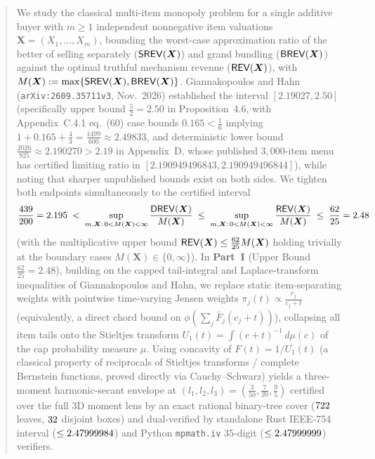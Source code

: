 \begin{abstract}
We study the classical multi-item monopoly problem for a single additive buyer with $m \ge 1$ independent nonnegative item valuations $\bm{X} = (X_1,\dots,X_m)$, bounding the worst-case approximation ratio of the better of selling separately ($\SREV(\bm{X})$) and grand bundling ($\BREV(\bm{X})$) against the optimal truthful mechanism revenue ($\REV(\bm{X})$), with $M(\bm{X}) := \max\{\SREV(\bm{X}), \BREV(\bm{X})\}$. Giannakopoulos and Hahn (\texttt{arXiv:2609.35711v3}, Nov.\ 2026) established the interval $[2.19027, 2.50]$ (specifically upper bound $\frac{5}{2} = 2.50$ in Proposition~4.6, with Appendix~C.4.1 eq.~(60) case bounds $0.165 < \frac{1}{6}$ implying $1 + 0.165 + \frac{4}{3} = \frac{1499}{600} \approx 2.49833$, and deterministic lower bound $\frac{2026}{925} \approx 2.190270 > 2.19$ in Appendix~D, whose published $3{,}000$-item menu has certified limiting ratio in $[2.190949496843, 2.190949496844]$), while noting that sharper unpublished bounds exist on both sides. We tighten both endpoints simultaneously to the certified interval
\[
  \frac{439}{200} = 2.195 \;<\; \sup_{m,\bm{X}:\,0<M(\bm{X})<\infty} \frac{\DREV(\bm{X})}{M(\bm{X})}
  \;\le\; \sup_{m,\bm{X}:\,0<M(\bm{X})<\infty} \frac{\REV(\bm{X})}{M(\bm{X})}
  \;\le\; \frac{62}{25} = 2.48
\]
(with the multiplicative upper bound $\REV(\bm{X}) \le \frac{62}{25} M(\bm{X})$ holding trivially at the boundary cases $M(\bm{X}) \in \{0,\infty\}$).
In \textbf{Part~I} (Upper Bound $\frac{62}{25} = 2.48$), building on the capped tail-integral and Laplace-transform inequalities of Giannakopoulos and Hahn, we replace static item-separating weights with pointwise time-varying Jensen weights $\pi_j(t) \propto \frac{r_j}{c_j+t}$ (equivalently, a direct chord bound on $\phi(\sum_j \bar{F}_j(c_j+t))$), collapsing all item tails onto the Stieltjes transform $U_1(t) = \int (c+t)^{-1}\,d\mu(c)$ of the cap probability measure $\mu$. Using concavity of $F(t) = 1/U_1(t)$ (a classical property of reciprocals of Stieltjes transforms / complete Bernstein functions, proved directly via Cauchy--Schwarz) yields a three-moment harmonic-secant envelope at $(l_1,l_2,l_3) = (\frac{3}{50}, \frac{7}{20}, \frac{9}{5})$ certified over the full 3D moment lens by an exact rational binary-tree cover ($\LeafCount$ leaves, $\DisjointCount$ disjoint boxes) and dual-verified by standalone Rust IEEE-754 interval ($\le \RustCertUB$) and Python \texttt{mpmath.iv} $35$-digit ($\le \PyCertUB$) verifiers.


\end{abstract}
